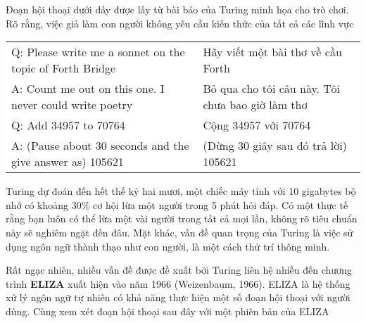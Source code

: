 Đoạn hội thoại dưới đấy được lấy từ bài báo của Turing minh họa cho trò chơi. Rõ rằng, việc giả làm con người không yêu cầu kiến thức của tất cả các lĩnh vực

\vspace{1em}
\hspace*{-6em}
\colorbox{background}{
\begin{tabular}{ l | l}
  Q: Please write me a sonnet on the topic of Forth Bridge  & Hãy viết một bài thơ về cầu Forth \\
  A: Count me out on this one. I never could write poetry & Bỏ qua cho tôi câu này. Tôi chưa bao giờ làm thơ \\
  Q: Add 34957 to 70764 & Cộng 34957 với 70764\\
  A: (Pause about 30 seconds and the give answer as) 105621 & (Dừng 30 giây sau đó trả lời) 105621 \\
\end{tabular}
}


Turing dự đoán đến hết thế kỷ hai mươi, một chiếc máy tính với 10 gigabytes bộ nhớ có khoảng 30\% cơ hội lừa một người trong 5 phút hỏi đáp. Có một thực tế rằng bạn luôn có thể lừa một vài người trong tất cả mọi lần, không rõ tiêu chuẩn này sẽ nghiêm ngặt đến đâu. Mặt khác, vấn đề quan trọng của Turing là việc sử dụng ngôn ngữ thành thạo như con người, là một cách thử trí thông minh.

Rất ngạc nhiên, nhiều vấn đề được đề xuất bởi Turing liên hệ nhiều đến chương trình \textbf{ELIZA} xuất hiện vào năm 1966 (Weizenbaum, 1966). ELIZA là hệ thống xử lý ngôn ngữ tự nhiên có khả năng thực hiện một số đoạn hội thoại với người dùng. Cùng xem xét đoạn hội thoại sau đây với một phiên bản của ELIZA

